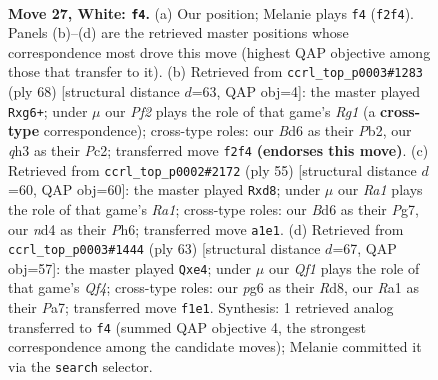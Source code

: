 \documentclass[11pt]{article}
\begin{document}
\clearpage

\begin{figure}[p]\centering
\begin{subfigure}{0.46\textwidth}\centering
\resizebox{\linewidth}{!}{%
\newchessgame
\chessboard[
  setfen={4r1k1/p4p1p/3B2p1/8/3n4/P6q/5P2/R3rQK1 w - - 0 27},
  showmover=false,
  pgfstyle=straightmove, color=movearrow, markmove={f2-f4}
]}
\caption{}
\end{subfigure}\hfill
\begin{subfigure}{0.46\textwidth}\centering
\resizebox{\linewidth}{!}{%
\newchessgame
\chessboard[
  setfen={7r/1p2r1k1/p2p2q1/8/4p3/P7/1PP1Q2P/1K4R1 w - - 0 35},
  showmover=false,
  pgfstyle=straightmove, color=movearrow, markmove={g1-g6}
]}
\caption{}
\end{subfigure}
\\[4pt]
\begin{subfigure}{0.46\textwidth}\centering
\resizebox{\linewidth}{!}{%
\newchessgame
\chessboard[
  setfen={r2Rq1k1/p4pp1/7p/4P3/2p2P2/P5P1/4QK1P/3R4 b - - 0 28},
  showmover=false,
  pgfstyle=straightmove, color=movearrow, markmove={a8-d8}
]}
\caption{}
\end{subfigure}\hfill
\begin{subfigure}{0.46\textwidth}\centering
\resizebox{\linewidth}{!}{%
\newchessgame
\chessboard[
  setfen={3r4/p5bk/7p/5qp1/4Q3/B1P1R3/P4P1P/6K1 b - - 0 32},
  showmover=false,
  pgfstyle=straightmove, color=movearrow, markmove={f5-e4}
]}
\caption{}
\end{subfigure}
\caption{\textbf{Move 27, White: \texttt{f4}.} (a) Our position; Melanie plays \texttt{f4} (\texttt{f2f4}). Panels (b)--(d) are the retrieved master positions whose correspondence most drove this move (highest QAP objective among those that transfer to it). (b) Retrieved from \texttt{ccrl\_top\_p0003\#1283} (ply 68) [structural distance $d$=63, QAP obj=4]: the master played \texttt{Rxg6+}; under $\mu$ our \emph{Pf2} plays the role of that game's \emph{Rg1} (a \textbf{cross-type} correspondence); cross-type roles: our \emph{B}d6 as their \emph{P}b2, our \emph{q}h3 as their \emph{P}c2; transferred move \texttt{f2f4} \textbf{(endorses this move)}. (c) Retrieved from \texttt{ccrl\_top\_p0002\#2172} (ply 55) [structural distance $d$=60, QAP obj=60]: the master played \texttt{Rxd8}; under $\mu$ our \emph{Ra1} plays the role of that game's \emph{Ra1}; cross-type roles: our \emph{B}d6 as their \emph{P}g7, our \emph{n}d4 as their \emph{P}h6; transferred move \texttt{a1e1}. (d) Retrieved from \texttt{ccrl\_top\_p0003\#1444} (ply 63) [structural distance $d$=67, QAP obj=57]: the master played \texttt{Qxe4}; under $\mu$ our \emph{Qf1} plays the role of that game's \emph{Qf4}; cross-type roles: our \emph{p}g6 as their \emph{R}d8, our \emph{R}a1 as their \emph{P}a7; transferred move \texttt{f1e1}. Synthesis: 1 retrieved analog transferred to \texttt{f4} (summed QAP objective 4, the strongest correspondence among the candidate moves); Melanie committed it via the \texttt{search} selector.}
\label{fig:thought-m52}
\end{figure}
\end{document}
